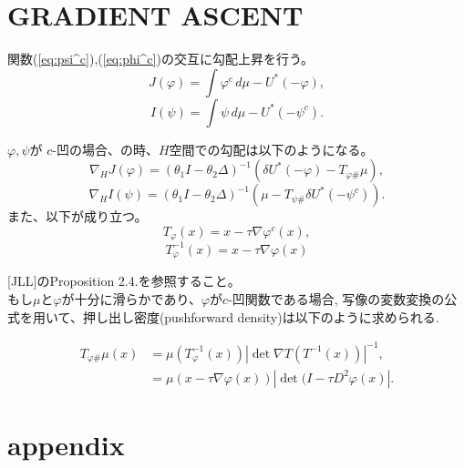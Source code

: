 \documentclass{jsarticle}
\theoremstyle{definition}
\begin{document}
\section{GRADIENT ASCENT}

関数(\ref{eq:psi^c}),(\ref{eq:phi^c})の交互に勾配上昇を行う。
\[
  J(\varphi) = \int \varphi^c \, d\mu - U^*(-\varphi),
\]
\[
  I(\psi) = \int \psi \, d\mu - U^*(-\psi^c).
\]

$\varphi,  \psi$が $c$-凹の場合、の時、$H$空間での勾配は以下のようになる。
\[
  \nabla_H J(\varphi) = (\theta_1 I - \theta_2 \Delta)^{-1} (\delta U^*(- \varphi) - T_{\varphi \#} \mu),
\]
\[
  \nabla_H I(\psi) = (\theta_1 I - \theta_2 \Delta)^{-1} (\mu - T_{\psi \#} \delta U^* (- \psi^c)).
\]
また、以下が成り立つ。
\[
  T_\varphi(x) = x - \tau \nabla \varphi^c(x),
\]
\[
  T_\varphi^{-1}(x) = x - \tau \nabla \varphi(x)
\]

[JLL]のProposition 2.4.を参照すること。\\

もし$\mu$と$\varphi$が十分に滑らかであり、$\varphi$が$c$-凹関数である場合,
写像の変数変換の公式を用いて、押し出し密度(pushforward density)は以下のように求められる.

\begin{align*}
  T_{\varphi \#} \mu(x) &= \mu(T_\varphi^{-1}(x)) | \det \nabla T(T^{-1}(x)) |^{-1},\\
                        &= \mu(x - \tau \nabla \varphi(x)) | \det(I - \tau D^2 \varphi(x) |.
\end{align*}






\section{appendix}
\end{document}
